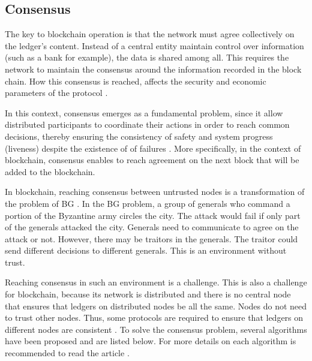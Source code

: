 \subsection{Consensus}\label{sec:consenso}
The key to blockchain operation is that the network must agree collectively on the ledger's content. Instead of a central entity maintain control over information (such as a bank for example), the data is shared among all. This requires the network to maintain the consensus around the information recorded in the block chain. How this consensus is reached, affects the security and economic parameters of the protocol \cite{kostarev2017review}.

In this context, consensus emerges as a fundamental problem, since it allow distributed participants to coordinate their actions in order to reach common decisions, thereby ensuring the consistency of safety and system progress (liveness) despite the existence of of failures \cite{greve2018blockchain}. More specifically, in the context of blockchain, consensus enables to reach agreement on the next block that will be added to the blockchain.

In blockchain, reaching consensus between untrusted nodes is a transformation of the problem of \ac{BG} \cite{lamport1982byzantine}. In the BG problem, a group of generals who command a portion of the Byzantine army circles the city. The attack would fail if only part of the generals attacked the city. Generals need to communicate to agree on the attack or not. However, there may be traitors in the generals. The traitor could send different decisions to different generals. This is an environment without trust.

Reaching consensus in such an environment is a challenge. This is also a challenge for blockchain, because its network is distributed and there is no central node that ensures that ledgers on distributed nodes be all the same. Nodes do not need to trust other nodes. Thus, some protocols are required to ensure that ledgers on different nodes are consistent \cite{kostarev2017review}. To solve the consensus problem, several algorithms have been proposed and are listed below. For more details on each algorithm is recommended to read the article \cite{mingxiao2017review}.

